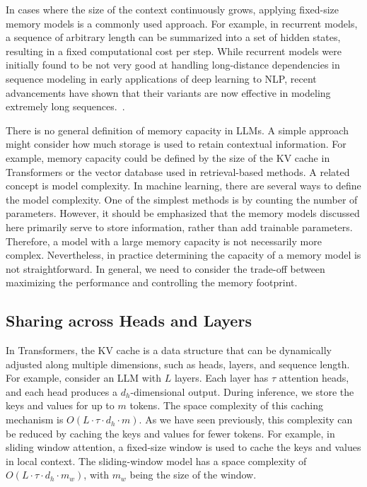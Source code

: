 In cases where the size of the context continuously grows, applying fixed-size memory models is a commonly used approach. For example, in recurrent models, a sequence of arbitrary length can be summarized into a set of hidden states, resulting in a fixed computational cost per step. While recurrent models were initially found to be not very good at handling long-distance dependencies in sequence modeling in early applications of deep learning to NLP, recent advancements have shown that their variants are now effective in modeling extremely long sequences.~\cite{bulatov-etal:2022recurrent,hutchins-etal:2022block,munkhdalai-etal:2024leave,ma-etal:2024megalodon}.

There is no general definition of memory capacity in LLMs. A simple approach might consider how much storage is used to retain contextual information. For example, memory capacity could be defined by the size of the KV cache in Transformers or the vector database used in retrieval-based methods. A related concept is model complexity. In machine learning, there are several ways to define the model complexity. One of the simplest methods is by counting the number of parameters. However, it should be emphasized that the memory models discussed here primarily serve to store information, rather than add trainable parameters. Therefore, a model with a large memory capacity is not necessarily more complex. Nevertheless, in practice determining the capacity of a memory model is not straightforward. In general, we need to consider the trade-off between maximizing the performance and controlling the memory footprint.

\subsection{Sharing across Heads and Layers}

\noindent In Transformers, the KV cache is a data structure that can be dynamically adjusted along multiple dimensions, such as heads, layers, and sequence length. For example, consider an LLM with $L$ layers. Each layer has $\tau$ attention heads, and each head produces a $d_h$-dimensional output. During inference, we store the keys and values for up to $m$ tokens. The space complexity of this caching mechanism is $O(L \cdot \tau \cdot d_h \cdot m)$.  As we have seen previously, this complexity can be reduced by caching the keys and values for fewer tokens. For example, in sliding window attention, a fixed-size window is used to cache the keys and values in local context. The sliding-window model has a space complexity of $O(L \cdot \tau \cdot d_h \cdot m_w)$, with $m_w$ being the size of the window.


